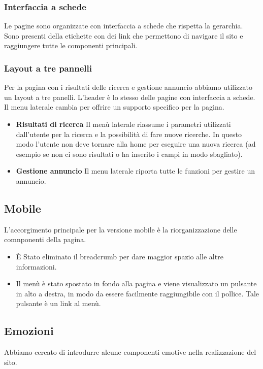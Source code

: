 \documentclass[1_relazione.tex]{subfiles}
\begin{document}
\subsubsection{Interfaccia a schede} 
Le pagine sono organizzate con interfaccia a schede che rispetta la gerarchia. Sono presenti della etichette con dei link che permettono di navigare il sito e raggiungere tutte le componenti principali.
\subsubsection{Layout a tre pannelli} 
Per la pagina con i risultati delle ricerca e gestione annuncio abbiamo utilizzato un layout a tre panelli. L'header \`{e} lo stesso delle pagine con interfaccia a schede. Il menu laterale cambia per offrire un supporto specifico per la pagina.

\begin{itemize}
\item \textbf{Risultati di ricerca} Il men\`{u} laterale riassume i parametri utilizzati dall'utente per la ricerca e la possibilit\`{a} di fare nuove ricerche. In questo modo l'utente non deve tornare alla home per eseguire una nuova ricerca (ad esempio se non ci sono risultati o ha inserito i campi in modo sbagliato).
\item \textbf{Gestione annuncio} Il menu laterale riporta tutte le funzioni per gestire un annuncio. 
\end{itemize}

\subsection{Mobile}
L'accorgimento principale per la versione mobile è la riorganizzazione delle comnponenti della pagina.\\
\begin{itemize}
    \item \`{E} Stato eliminato il breadcrumb per dare maggior spazio alle altre informazioni.
    \item Il menù è stato spostato in fondo alla pagina e viene visualizzato un pulsante in alto a destra, in modo da essere facilmente raggiungibile con il pollice. Tale pulsante è un link al menù.
\end{itemize}



\subsection{Emozioni}
Abbiamo cercato di introdurre alcune componenti emotive nella realizzazione del sito.
\end{document}
